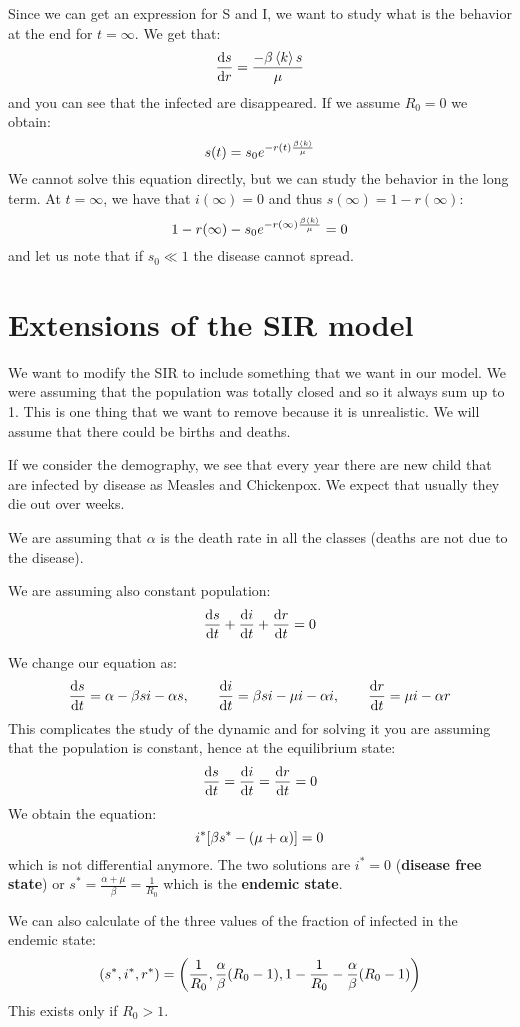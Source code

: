 \documentclass[../main/main.tex]{subfiles}
\begin{document}
Since we can get an expression for S and I, we want to study what is the behavior at the end for \( t = \infty  \). We get that:
\begin{equation*}
  \dv{s}{r} = \frac{- \beta  \expval{k}  s}{\mu }
\end{equation*}
and you can see that the infected are disappeared. If we assume \( R_0 = 0  \) we obtain:
\begin{equation*}
  s(t) = s_0 e^{-r(t) \frac{\beta \expval{k} }{\mu }}
\end{equation*}
We cannot solve this equation directly, but we can study the behavior in the long term. At \( t=\infty  \), we have that \( i (\infty ) = 0 \) and thus \( s(\infty ) = 1 - r(\infty ) \):
\begin{equation*}
  1 - r(\infty ) - s_0 e^{-r(\infty ) \frac{\beta \expval{k} }{\mu }} = 0
\end{equation*}
and let us note that if \( s_0 \ll 1 \) the disease cannot spread.


\section{Extensions of the SIR model}
We want to modify the SIR to include something that we want in our model. We were assuming that the population was totally closed and so it always sum up to 1. This is one thing that we want to remove because it is unrealistic. We will assume that there could be births and deaths.

If we consider the demography, we see that every year there are new child that are infected by disease as Measles and Chickenpox. We expect that usually they die out over weeks.

We are assuming that \( \alpha  \) is the death rate in all the classes (deaths are not due to the disease).

We are assuming also constant population:
\begin{equation*}
  \dv{s}{t} + \dv{i}{t} + \dv{r}{t} = 0
\end{equation*}

We change our equation as:
\begin{equation*}
  \dv{s}{t} = \alpha - \beta s i - \alpha s, \qquad \dv{i}{t} = \beta s i - \mu i - \alpha i, \qquad \dv{r}{t} = \mu i - \alpha r
\end{equation*}
This complicates the study of the dynamic and for solving it you are assuming that the population is constant, hence at the equilibrium state:
\begin{equation*}
  \dv{s}{t} = \dv{i}{t} = \dv{r}{t} = 0
\end{equation*}
We obtain the equation:
\begin{equation*}
  i^* \qty[\beta s^* - (\mu + \alpha )] = 0
\end{equation*}
which is not differential anymore. The two solutions are \( i^* = 0 \) (\textbf{disease free state}) or \( s^* = \frac{\alpha + \mu }{\beta } = \frac{1}{R_0} \) which is the \textbf{endemic state}.

We can also calculate of the three values of the fraction of infected in the endemic state:
\begin{equation*}
  (s^*, i^*, r^*) = \qty( \frac{1}{R_0}, \frac{\alpha }{\beta } (R_0 -1 ), 1- \frac{1}{R_0} - \frac{\alpha }{\beta } (R_0-1))
\end{equation*}
This exists only if \( R_0>1 \).
\end{document}
